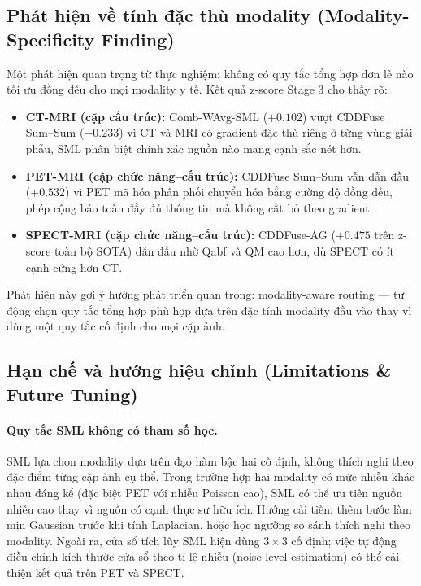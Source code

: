 \subsection{Phát hiện về tính đặc thù modality (Modality-Specificity Finding)}

Một phát hiện quan trọng từ thực nghiệm: không có quy tắc tổng hợp đơn lẻ nào tối ưu đồng đều cho mọi modality y tế. Kết quả z-score Stage 3 cho thấy rõ:
\begin{itemize}[leftmargin=1.5em, itemsep=2pt]
  \item \textbf{CT-MRI (cặp cấu trúc):} Comb-WAvg-SML ($+0.102$) vượt CDDFuse Sum--Sum ($-0.233$) vì CT và MRI có gradient đặc thù riêng ở từng vùng giải phẫu, SML phân biệt chính xác nguồn nào mang cạnh sắc nét hơn.
  \item \textbf{PET-MRI (cặp chức năng--cấu trúc):} CDDFuse Sum--Sum vẫn dẫn đầu ($+0.532$) vì PET mã hóa phân phối chuyển hóa bằng cường độ đồng đều, phép cộng bảo toàn đầy đủ thông tin mà không cắt bỏ theo gradient.
  \item \textbf{SPECT-MRI (cặp chức năng--cấu trúc):} CDDFuse-AG ($+0.475$ trên z-score toàn bộ SOTA) dẫn đầu nhờ Qabf và QM cao hơn, dù SPECT có ít cạnh cứng hơn CT.
\end{itemize}
Phát hiện này gợi ý hướng phát triển quan trọng: modality-aware routing --- tự động chọn quy tắc tổng hợp phù hợp dựa trên đặc tính modality đầu vào thay vì dùng một quy tắc cố định cho mọi cặp ảnh.

\subsection{Hạn chế và hướng hiệu chỉnh (Limitations \& Future Tuning)}

\paragraph{Quy tắc SML không có tham số học.}
SML lựa chọn modality dựa trên đạo hàm bậc hai cố định, không thích nghi theo đặc điểm từng cặp ảnh cụ thể. Trong trường hợp hai modality có mức nhiễu khác nhau đáng kể (đặc biệt PET với nhiễu Poisson cao), SML có thể ưu tiên nguồn nhiễu cao thay vì nguồn có cạnh thực sự hữu ích. Hướng cải tiến: thêm bước làm mịn Gaussian trước khi tính Laplacian, hoặc học ngưỡng so sánh thích nghi theo modality. Ngoài ra, cửa sổ tích lũy SML hiện dùng $3\times3$ cố định; việc tự động điều chỉnh kích thước cửa sổ theo tỉ lệ nhiễu (noise level estimation) có thể cải thiện kết quả trên PET và SPECT.

